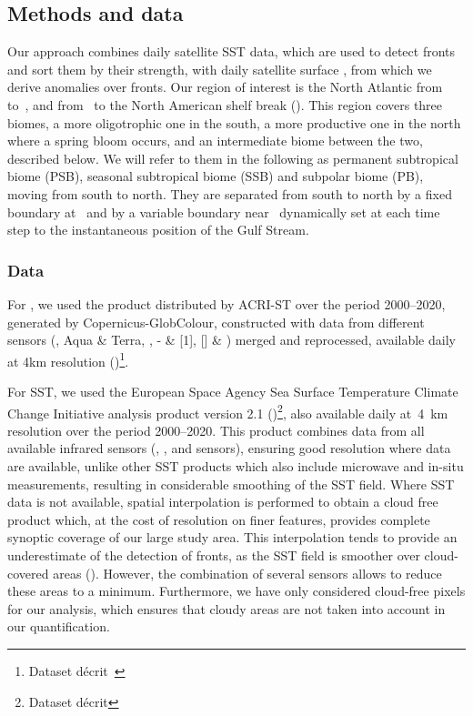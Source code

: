 \subsection{Methods and data}

Our approach combines daily satellite SST data, which are used to detect fronts and sort them by their strength, with daily satellite surface , from which we derive anomalies over fronts.
Our region of interest is the North Atlantic from~ to~, and from~ to the North American shelf break ().
This region covers three biomes, a more oligotrophic one in the south, a more productive one in the north where a spring bloom occurs, and an intermediate biome between the two, described below.
We will refer to them in the following as permanent subtropical biome (PSB), seasonal subtropical biome (SSB) and subpolar biome (PB), moving from south to north.
They are separated from south to north by a fixed boundary at~ and by a variable boundary near~ dynamically set at each time step to the instantaneous position of the Gulf Stream.

\subsubsection{Data}

For , we used the  product distributed by ACRI-ST over the period 2000--2020, generated by Copernicus-GlobColour, constructed with data from different sensors (,  Aqua \& Terra, , - \& [1], [] \& ) merged and reprocessed, available daily at 4km resolution (\cite{article_chl})\footnote{Dataset  décrit~}.

For SST, we used the European Space Agency Sea Surface Temperature Climate Change Initiative analysis product version 2.1 (\cite{merchant_2019, article_sst, good_2020})\footnote{Dataset  décrit }, also available daily at~\qty{4}{\km} resolution over the period 2000--2020.
This product combines data from all available infrared sensors (, , and  sensors), ensuring good resolution where data are available, unlike other SST products which also include microwave and in-situ measurements, resulting in considerable smoothing of the SST field. %
Where SST data is not available, spatial interpolation is performed to obtain a cloud free product which, at the cost of resolution on finer features, provides complete synoptic coverage of our large study area.
This interpolation tends to provide an underestimate of the detection of fronts, as the SST field is smoother over cloud-covered areas (\cite{merchant_2019}).
However, the combination of several sensors allows to reduce these areas to a minimum.
Furthermore, we have only considered cloud-free pixels for our analysis, which ensures that cloudy areas are not taken into account in our quantification.


